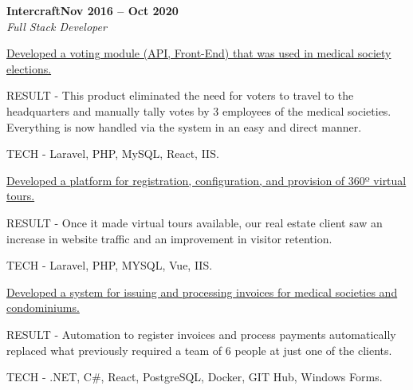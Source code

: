 \documentclass[letterpaper,10pt]{article}
\newcommand{\heading}[2]{
  \hspace{10pt}#1\hfill#2\\
}
\newcommand{\headingBf}[2]{
  \heading{\textbf{#1}}{\textbf{#2}}
}
\newcommand{\headingIt}[2]{
  \heading{\textit{#1}}{\textit{#2}}
}
\newenvironment{resume_list}{
  \vspace{-7pt}
  \begin{itemize}[itemsep=-2px, parsep=1pt, leftmargin=30pt]
}{
  \end{itemize}
}
\newcommand{\itemTitle}[1]{
  \item[] \underline{#1}\vspace{4pt}
}
\begin{document}
  \headingBf{Intercraft}{Nov 2016 -- Oct 2020}
  \headingIt{Full Stack Developer}{}
  \begin{resume_list}
    \itemTitle{Developed a voting module (API, Front-End) that was used in medical society elections.}
    \item RESULT - This product eliminated the need for voters to travel to the headquarters and manually tally votes by 3 employees of the medical societies. Everything is now handled via the system in an easy and direct manner.
    \item TECH - Laravel, PHP, MySQL, React, IIS.
    
    \vspace{5pt}
    \itemTitle{Developed a platform for registration, configuration, and provision of 360º virtual tours.}
    \item RESULT - Once it made virtual tours available, our real estate client saw an increase in website traffic and an improvement in visitor retention.
    \item TECH - Laravel, PHP, MYSQL, Vue, IIS.
    
    \vspace{5pt}
    \itemTitle{Developed a system for issuing and processing invoices for medical societies and condominiums.}
    \item RESULT - Automation to register invoices and process payments automatically replaced what previously required a team of 6 people at just one of the clients.
    \item TECH - .NET, C\#, React, PostgreSQL, Docker, GIT Hub, Windows Forms.
  \end{resume_list}


  
\end{document}
